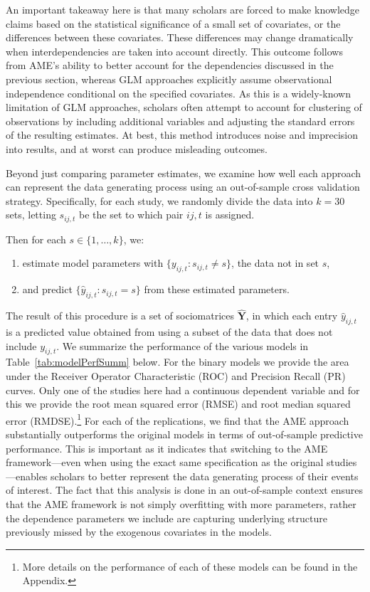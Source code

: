 An important takeaway here is that many scholars are forced to make knowledge claims based on the statistical significance of a small set of covariates, or the differences between these covariates. These differences may change dramatically when interdependencies are taken into account directly. This outcome follows from AME's ability to better account for the dependencies discussed in the previous section, whereas GLM approaches explicitly assume observational independence conditional on the specified covariates. As this is a widely-known limitation of GLM approaches, scholars often attempt to account for clustering of observations by including additional variables and adjusting the standard errors of the resulting estimates. At best, this method introduces noise and imprecision into results, and at worst can produce misleading outcomes. 

Beyond just comparing parameter estimates, we examine how well each approach can represent the data generating process using an out-of-sample cross validation strategy. Specifically, for each study, we randomly divide the data into $k=30$ sets, letting $s_{ij,t}$ be the set to which pair $ij,t$ is assigned.

Then for each $s \in \{1,\ldots,k\}$, we:

\begin{enumerate}
	\item estimate model parameters with $\{y_{ij,t}: s_{ij,t} \neq s\}$, the data not in set $s$,
	\item and predict $\{\hat{y}_{ij,t}: s_{ij,t} = s\}$ from these estimated parameters. 
\end{enumerate}

The result of this procedure is a set of sociomatrices $\bm \hat Y$, in which each entry $\hat y_{ij,t}$ is a predicted value obtained from using a subset of the data that does not include $y_{ij,t}$. We summarize the performance of the various models in Table~\ref{tab:modelPerfSumm} below. For the binary models we provide the area under the Receiver Operator Characteristic (ROC) and Precision Recall (PR) curves. Only one of the studies here had a continuous dependent variable and for this we provide the root mean squared error (RMSE) and root median squared error (RMDSE).\footnote{More details on the performance of each of these models can be found in the Appendix.} For each of the replications, we find that the AME approach substantially outperforms the original models in terms of out-of-sample predictive performance. This is important as it indicates that switching to the AME framework---even when using the exact same specification as the original studies---enables scholars to better represent the data generating process of their events of interest. The fact that this analysis is done in an out-of-sample context ensures that the AME framework is not simply overfitting with more parameters, rather the dependence parameters we include are capturing underlying structure previously missed by the exogenous covariates in the models.

